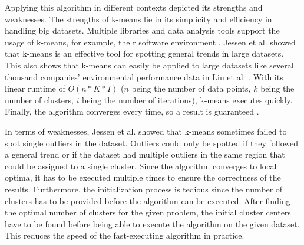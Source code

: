 Applying this algorithm in different contexts depicted its strengths and weaknesses.
The strengths of k-means lie in its simplicity and efficiency in handling big datasets.
Multiple libraries and data analysis tools support the usage of k-means, for example, the r software environment \cite{R-SOF}.
Jessen et al. \cite{JES-IND} showed that k-means is an effective tool for spotting general trends in large datasets.
This also shows that k-means can easily be applied to large datasets like several thousand companies' environmental performance data in Liu et al. \cite{LIU-BDE}.
With its linear runtime of $O(n * K * I)$ ($n$ being the number of data points, $k$ being the number of clusters, $i$ being the number of iterations), k-means executes quickly.
Finally, the algorithm converges every time, so a result is guaranteed \cite{SEL-GCT}.

In terms of weaknesses, Jessen et al. \cite{JES-IND} showed that k-means sometimes failed to spot single outliers in the dataset.
Outliers could only be spotted if they followed a general trend or if the dataset had multiple outliers in the same region that could be assigned to a single cluster.
Since the algorithm converges to local optima, it has to be executed multiple times to ensure the correctness of the results.
Furthermore, the initialization process is tedious since the number of clusters has to be provided before the algorithm can be executed.
After finding the optimal number of clusters for the given problem, the initial cluster centers have to be found before being able to execute the algorithm on the given dataset.
This reduces the speed of the fast-executing algorithm in practice.

